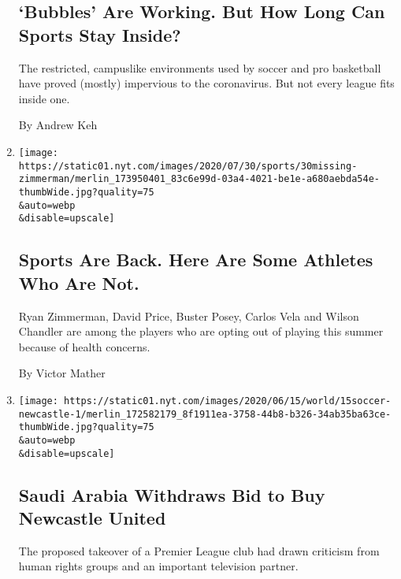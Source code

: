 \begin{enumerate}
  \hypertarget{bubbles-are-working-but-how-long-can-sports-stay-inside}{%
  \subsection{`Bubbles' Are Working. But How Long Can Sports Stay
  Inside?}\label{bubbles-are-working-but-how-long-can-sports-stay-inside}}

  The restricted, campuslike environments used by soccer and pro
  basketball have proved (mostly) impervious to the coronavirus. But not
  every league fits inside one.

  By Andrew Keh
\item
  \href{/2020/07/30/sports/players-opt-out.html}{}

  \texttt{[image: https://static01.nyt.com/images/2020/07/30/sports/30missing-zimmerman/merlin\_173950401\_83c6e99d-03a4-4021-be1e-a680aebda54e-thumbWide.jpg?quality=75\\\&auto=webp\\\&disable=upscale]}

  \hypertarget{sports-are-back-here-are-some-athletes-who-are-not}{%
  \subsection{Sports Are Back. Here Are Some Athletes Who Are
  Not.}\label{sports-are-back-here-are-some-athletes-who-are-not}}

  Ryan Zimmerman, David Price, Buster Posey, Carlos Vela and Wilson
  Chandler are among the players who are opting out of playing this
  summer because of health concerns.

  By Victor Mather
\item
  \href{/2020/07/30/sports/soccer/saudi-arabia-newcastle-united.html}{}

  \texttt{[image: https://static01.nyt.com/images/2020/06/15/world/15soccer-newcastle-1/merlin\_172582179\_8f1911ea-3758-44b8-b326-34ab35ba63ce-thumbWide.jpg?quality=75\\\&auto=webp\\\&disable=upscale]}

  \hypertarget{saudi-arabia-withdraws-bid-to-buy-newcastle-united}{%
  \subsection{Saudi Arabia Withdraws Bid to Buy Newcastle
  United}\label{saudi-arabia-withdraws-bid-to-buy-newcastle-united}}

  The proposed takeover of a Premier League club had drawn criticism
  from human rights groups and an important television partner.


\end{enumerate}
